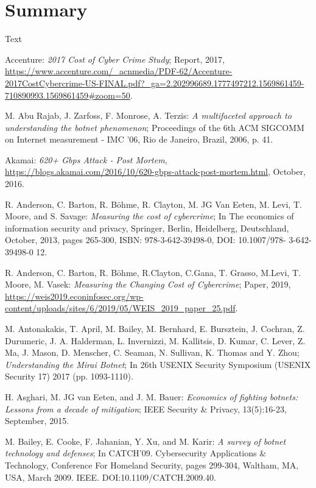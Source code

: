 \section{Summary}
Text

\begin{thebibliography}{99}
 Accenture: \emph{2017 Cost of Cyber Crime Study}; Report, 2017, \url{https://www.accenture.com/_acnmedia/PDF-62/Accenture-2017CostCybercrime-US-FINAL.pdf?_ga=2.202996689.1777497212.1569861459-710890993.1569861459#zoom=50}.

 M. Abu Rajab, J. Zarfoss, F. Monrose, A. Terzis: \emph{A multifaceted approach to understanding the botnet phenomenon}; Proceedings of the 6th ACM SIGCOMM on Internet measurement  - IMC '06, Rio de Janeiro, Brazil, 2006, p. 41.

 Akamai: \emph{620+ Gbps Attack - Post Mortem}, \url{https://blogs.akamai.com/2016/10/620-gbps-attack-post-mortem.html}, October, 2016.

 R. Anderson, C. Barton, R. Böhme, R. Clayton, M. JG Van Eeten, M. Levi, T. Moore, and S. Savage: \emph{Measuring the cost of cybercrime}; In The economics of information security and privacy, Springer, Berlin, Heidelberg, Deutschland, October, 2013, pages 265-300, ISBN: 978-3-642-39498-0, DOI: 10.1007/978- 3-642-39498-0 12.

 R. Anderson, C. Barton, R. Böhme, R.Clayton, C.Gana, T. Grasso, M.Levi, T. Moore, M. Vasek: \emph{Measuring the Changing Cost of Cybercrime}; Paper, 2019, \url{https://weis2019.econinfosec.org/wp-content/uploads/sites/6/2019/05/WEIS_2019_paper_25.pdf}.

 M. Antonakakis, T. April, M. Bailey, M. Bernhard, E. Bursztein, J. Cochran, Z. Durumeric, J. A. Halderman, L. Invernizzi, M. Kallitsis, D. Kumar, C. Lever, Z. Ma, J. Mason, D. Menscher, C. Seaman, N. Sullivan, K. Thomas and Y. Zhou; \emph{Understanding the Mirai Botnet}; In 26th {USENIX} Security Symposium ({USENIX} Security 17) 2017 (pp. 1093-1110).

 H. Asghari, M. JG van Eeten, and J. M. Bauer: \emph{Economics of fighting botnets: Lessons from a decade of mitigation}; IEEE Security \& Privacy, 13(5):16-23, September, 2015.

 M. Bailey, E. Cooke, F. Jahanian, Y. Xu, and M. Karir: \emph{A survey of botnet technology and defenses}; In CATCH'09. Cybersecurity Applications \& Technology, Conference For Homeland Security, pages 299-304, Waltham, MA, USA, March 2009. IEEE. DOI:10.1109/CATCH.2009.40.


\end{thebibliography}
